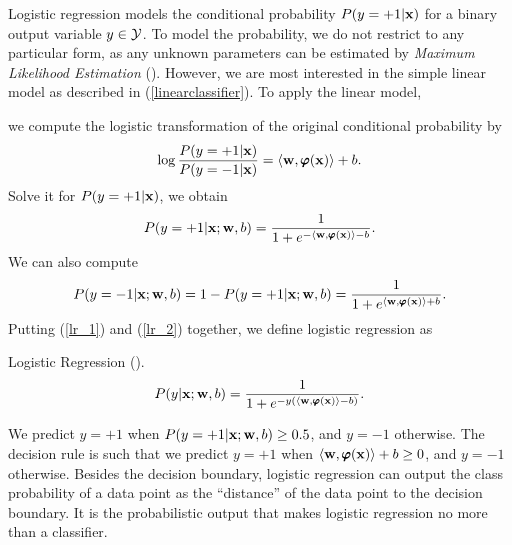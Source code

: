 {Logistic regression models the conditional probability $P(y=+1|\mathbf {x})$ for a binary output variable $y\in\mathcal{Y}$.
To model the probability, we do not restrict to any particular form, as any unknown parameters can be estimated by \textit{Maximum Likelihood Estimation} (\mle).
However, we are most interested in the simple linear model as described in (\ref{linearclassifier}).
To apply the linear model,

we compute the logistic transformation of the original conditional probability by
\begin{align*}
	\log\frac{P(y=+1|\mathbf {x})}{P(y=-1|\mathbf {x})} = \langle \mathbf {w}, \pmb \varphi(\mathbf {x}) \rangle + b.
\end{align*}
Solve it for $P(y=+1|\mathbf {x})$, we obtain
\begin{align}
	P(y=+1|\mathbf {x};\mathbf {w},b) = \frac{1}{1+e^{ -\langle \mathbf {w}, \pmb \varphi(\mathbf {x}) \rangle-b }}. \label{lr_1}
\end{align}
We can also compute
\begin{align}
	P(y=-1|\mathbf {x};\mathbf {w},b)=1-P(y=+1|\mathbf {x};\mathbf {w},b)=\frac{1}{1+e^{ \langle \mathbf {w}, \pmb \varphi(\mathbf {x}) \rangle+b }}. \label{lr_2}
\end{align}
Putting (\ref{lr_1}) and (\ref{lr_2}) together, we define logistic regression as
\begin{definition}{Logistic Regression (\lr).} \label{logistic_regression}
	\begin{align*}
		P(y|\mathbf {x};\mathbf {w},b) = \frac{1}{1+e^{ -y(\langle \mathbf {w}, \pmb \varphi(\mathbf {x}) \rangle-b) }}.
	\end{align*}
\end{definition}
\noindent
We predict $y=+1$ when $P(y=+1|\mathbf {x};\mathbf {w},b)\ge0.5$, and $y=-1$ otherwise.
The decision rule is such that we predict $y=+1$ when $\langle \mathbf {w}, \pmb \varphi(\mathbf {x}) \rangle+b\ge0$, and $y=-1$ otherwise.
Besides the decision boundary, logistic regression can output the class probability of a data point as the ``distance'' of the data point to the decision boundary.
It is the probabilistic output that makes logistic regression no more than a classifier.

}
